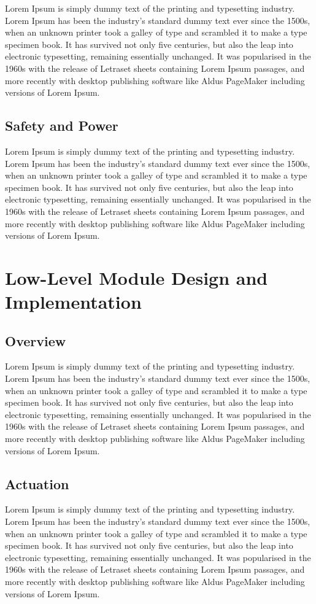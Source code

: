 Lorem Ipsum is simply dummy text of the printing and typesetting industry. Lorem Ipsum has been the industry's standard dummy text ever since the 1500s, when an unknown printer took a galley of type and scrambled it to make a type specimen book. It has survived not only five centuries, but also the leap into electronic typesetting, remaining essentially unchanged. It was popularised in the 1960s with the release of Letraset sheets containing Lorem Ipsum passages, and more recently with desktop publishing software like Aldus PageMaker including versions of Lorem Ipsum.

\subsection{Safety and Power}
Lorem Ipsum is simply dummy text of the printing and typesetting industry. Lorem Ipsum has been the industry's standard dummy text ever since the 1500s, when an unknown printer took a galley of type and scrambled it to make a type specimen book. It has survived not only five centuries, but also the leap into electronic typesetting, remaining essentially unchanged. It was popularised in the 1960s with the release of Letraset sheets containing Lorem Ipsum passages, and more recently with desktop publishing software like Aldus PageMaker including versions of Lorem Ipsum.

\section{Low-Level Module Design and Implementation}
\subsection{Overview}
Lorem Ipsum is simply dummy text of the printing and typesetting industry. Lorem Ipsum has been the industry's standard dummy text ever since the 1500s, when an unknown printer took a galley of type and scrambled it to make a type specimen book. It has survived not only five centuries, but also the leap into electronic typesetting, remaining essentially unchanged. It was popularised in the 1960s with the release of Letraset sheets containing Lorem Ipsum passages, and more recently with desktop publishing software like Aldus PageMaker including versions of Lorem Ipsum.

\subsection{Actuation}
Lorem Ipsum is simply dummy text of the printing and typesetting industry. Lorem Ipsum has been the industry's standard dummy text ever since the 1500s, when an unknown printer took a galley of type and scrambled it to make a type specimen book. It has survived not only five centuries, but also the leap into electronic typesetting, remaining essentially unchanged. It was popularised in the 1960s with the release of Letraset sheets containing Lorem Ipsum passages, and more recently with desktop publishing software like Aldus PageMaker including versions of Lorem Ipsum.

